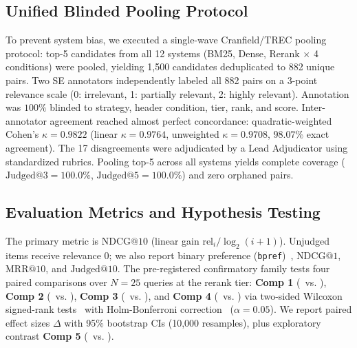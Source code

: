 \subsection{Unified Blinded Pooling Protocol}
\label{sec:approach:pooling}
To prevent system bias, we executed a single-wave Cranfield/TREC pooling protocol: top-5 candidates from all 12 systems (BM25, Dense, Rerank $\times$ 4 conditions) were pooled, yielding 1,500 candidates deduplicated to 882 unique pairs. 
Two SE annotators independently labeled all 882 pairs on a 3-point relevance scale (0: irrelevant, 1: partially relevant, 2: highly relevant). 
Annotation was $100\%$ blinded to strategy, header condition, tier, rank, and score. 
Inter-annotator agreement reached almost perfect concordance: quadratic-weighted Cohen's $\kappa = 0.9822$ (linear $\kappa = 0.9764$, unweighted $\kappa = 0.9708$, $98.07\%$ exact agreement). 
The 17 disagreements were adjudicated by a Lead Adjudicator using standardized rubrics. 
Pooling top-5 across all systems yields complete coverage ($\text{Judged@3} = 100.0\%$, $\text{Judged@5} = 100.0\%$) and zero orphaned pairs.

\subsection{Evaluation Metrics and Hypothesis Testing}
\label{sec:approach:metrics}
The primary metric is $\text{NDCG@10}$ (linear gain $\mathrm{rel}_i/\log_2(i+1)$). 
Unjudged items receive relevance 0; we also report binary preference (\texttt{bpref})~\cite{buckley2004bpref}, $\text{NDCG@1}$, $\text{MRR@10}$, and $\text{Judged@10}$. 
The pre-registered confirmatory family tests four paired comparisons over $N=25$ queries at the rerank tier: \textbf{Comp 1} (\astH\ vs. \lineN), \textbf{Comp 2} (\astN\ vs. \lineN), \textbf{Comp 3} (\astH\ vs. \astN), and \textbf{Comp 4} (\lineH\ vs. \lineN) via two-sided Wilcoxon signed-rank tests~\cite{wilcoxon1945individual} with Holm-Bonferroni correction~\cite{holm1979simple} ($\alpha = 0.05$). 
We report paired effect sizes $\Delta$ with 95\% bootstrap CIs (10,000 resamples), plus exploratory contrast \textbf{Comp 5} (\astH\ vs. \lineH).
